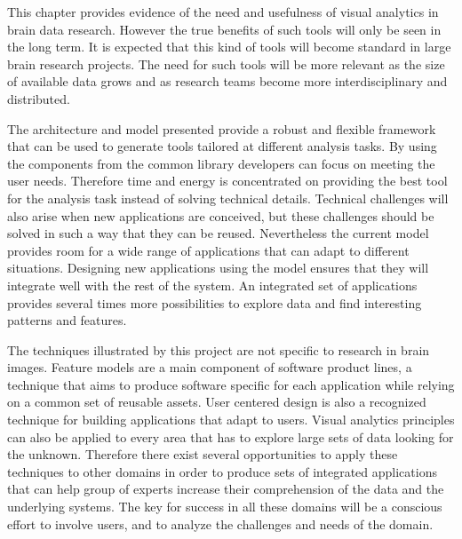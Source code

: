 This chapter provides evidence of the need and usefulness of visual analytics in brain data research. However the true benefits of such tools will only be seen in the long term. It is expected that this kind of tools will become standard in large brain research projects. The need for such tools will be more relevant as the size of available data grows and as research teams become more interdisciplinary and distributed.  

The architecture and model presented provide a robust and flexible framework that can be used to generate tools tailored at different analysis tasks. By using the components from the common library developers can focus on meeting the user needs. Therefore time and energy is concentrated on providing the best tool for the analysis task instead of solving technical details. Technical challenges will also arise when new applications are conceived, but these challenges should be solved in such a way that they can be reused. Nevertheless the current model provides room for a wide range of applications that can adapt to different situations. Designing new applications using the model ensures that they will integrate well with the rest of the system. An integrated set of applications provides several times more  possibilities to explore data and find interesting patterns and features. 


The techniques illustrated by this project are not specific to research in brain images. Feature models are a main component of software product lines, a technique that aims to produce software specific for each application while relying on a common set of reusable assets. User centered design is also a recognized technique for building applications that adapt to users. Visual analytics principles can also be applied to every area that has to explore large sets of data looking for the unknown. Therefore there exist several opportunities to apply these techniques to other domains in order to produce sets of integrated applications that can help group of experts increase their comprehension of the data and the underlying systems. The key for success in all these domains will be a conscious effort to involve users, and to analyze the challenges and needs of the domain. 
